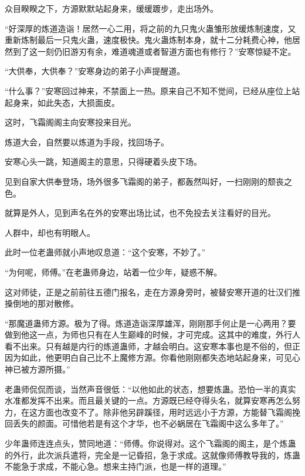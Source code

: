 
\begin{this_body}

众目睽睽之下，方源默默站起身来，缓缓踱步，走出场外。

“好深厚的炼道造诣！居然一心二用，将之前的九只鬼火蛊雏形放缓炼制速度，又重新炼制最后一只鬼火蛊，速度极快。鬼火蛊炼制本身，就十二分耗费心神，他居然到了这一刻仍旧游刃有余，难道魂道或者智道方面也有修行？”安寒惊疑不定。

“大供奉，大供奉？”安寒身边的弟子小声提醒道。

“什么事？”安寒回过神来，不禁面上一热。原来自己不知不觉间，已经从座位上站起身来，如此失态，大损面皮。

这时，飞霜阁阁主向安寒投来目光。

炼道大会，自然要以炼道为手段，找回场子。

安寒心头一跳，知道阁主的意思，只得硬着头皮下场。

见到自家大供奉登场，场外很多飞霜阁的弟子，都轰然叫好，一扫刚刚的颓丧之色。

就算是外人，见到声名在外的安寒出场比试，也不免投去关注看好的目光。

人群中，却也有明眼人。

此时一位老蛊师就小声地叹息道：“这个安寒，不妙了。”

“为何呢，师傅。”在老蛊师身边，站着一位少年，疑惑不解。

这对师徒，正是之前前往五德门报名，走在方源身旁时，被替安寒开道的壮汉们推搡倒地的那对散修。

“那魔道蛊师方源。极为了得。炼道造诣深厚雄浑，刚刚那手何止是一心两用？要做到他这一点，为师也只有在人生巅峰的时候，才可完成。这其中的难度，外行人看不出来。只有越是内行的炼道蛊师，才越会明白。这安寒本事也是不俗的，但正因为如此，他更明白自己比不上魔修方源。你看他刚刚都失态地站起身来，可见心神已被方源所摄。”

老蛊师侃侃而谈，当然声音很低：“以他如此的状态，想要炼蛊。恐怕一半的真实水准都发挥不出来。而且最关键的一点。方源既已经夺得头名，就算安寒再怎么努力，在这方面也改变不了。除非他另辟蹊径，用时远远小于方源，方能替飞霜阁挽回丢失的颜面。可惜他若是有这个才华，也不必蜗居在飞霜阁中这么多年了。”

少年蛊师连连点头，赞同地道：“师傅。你说得对。这个飞霜阁的阁主，是个炼蛊的外行，此次派兵遣将，完全是一记昏招，急于求成。这就像师傅教导我的，炼蛊不能急于求成，不能心急。想来主持门派，也是一样的道理。”


\end{this_body}
